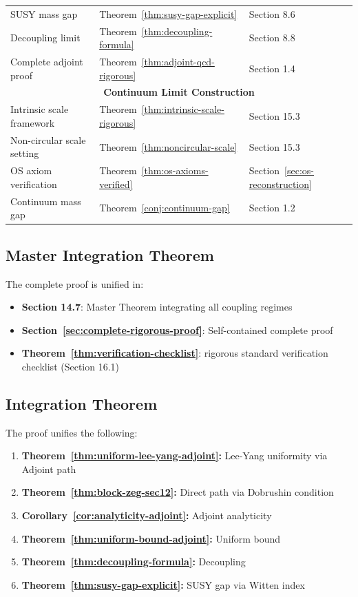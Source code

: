 \begin{tcolorbox}[colback=blue!5!white, colframe=blue!60!black, title=\textbf{Complete Cross-Reference Guide}]
\begin{center}
\begin{tabular}{|p{4cm}|p{5cm}|p{3.5cm}|}
SUSY mass gap & Theorem~\ref{thm:susy-gap-explicit} & Section 8.6 \\
Decoupling limit & Theorem~\ref{thm:decoupling-formula} & Section 8.8 \\
Complete adjoint proof & Theorem~\ref{thm:adjoint-qcd-rigorous} & Section 1.4 \\
\hline
\hline
\multicolumn{3}{|c|}{\textbf{Continuum Limit Construction}} \\
\hline
Intrinsic scale framework & Theorem~\ref{thm:intrinsic-scale-rigorous} & Section 15.3 \\
Non-circular scale setting & Theorem~\ref{thm:noncircular-scale} & Section 15.3 \\
OS axiom verification & Theorem~\ref{thm:os-axioms-verified} & Section~\ref{sec:os-reconstruction} \\
Continuum mass gap & Theorem~\ref{conj:continuum-gap} & Section 1.2 \\
\hline
\end{tabular}
\end{center}

\subsection*{Master Integration Theorem}

The complete proof is unified in:
\begin{itemize}
\item \textbf{Section 14.7}: Master Theorem integrating all coupling regimes
\item \textbf{Section~\ref{sec:complete-rigorous-proof}}: Self-contained complete proof
\item \textbf{Theorem~\ref{thm:verification-checklist}}: rigorous standard verification checklist (Section 16.1)
\end{itemize}

\subsection*{Integration Theorem}

The proof unifies the following:
\begin{enumerate}
\item \textbf{Theorem~\ref{thm:uniform-lee-yang-adjoint}:} Lee-Yang uniformity via Adjoint path
\item \textbf{Theorem~\ref{thm:block-zeg-sec12}:} Direct path via Dobrushin condition
\item \textbf{Corollary~\ref{cor:analyticity-adjoint}:} Adjoint analyticity
\item \textbf{Theorem~\ref{thm:uniform-bound-adjoint}:} Uniform bound
\item \textbf{Theorem~\ref{thm:decoupling-formula}:} Decoupling
\item \textbf{Theorem~\ref{thm:susy-gap-explicit}:} SUSY gap via Witten index
\end{enumerate}
\end{tcolorbox}


